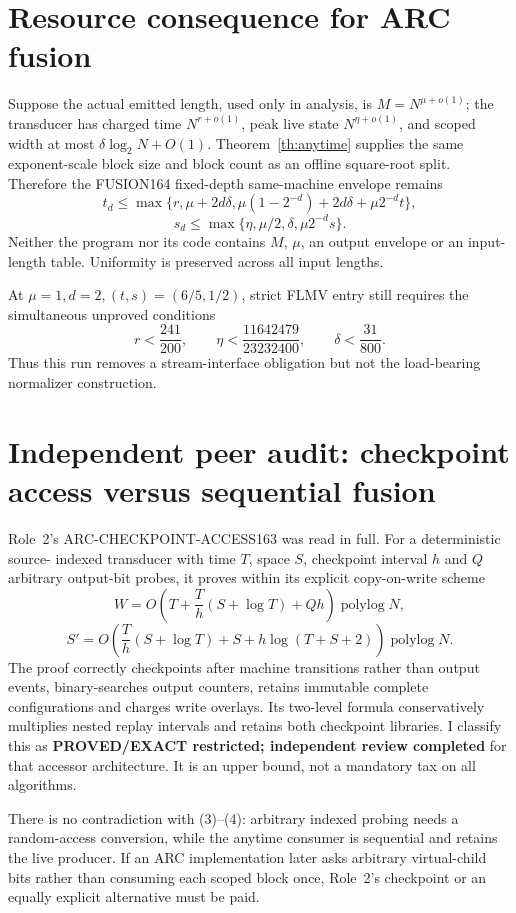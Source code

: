 \documentclass[11pt]{article}
\begin{document}
\section{Resource consequence for ARC fusion}
Suppose the actual emitted length, used only in analysis, is
$M=N^{\mu+o(1)}$; the transducer has charged time $N^{r+o(1)}$, peak live state
$N^{\eta+o(1)}$, and scoped width at most
$\delta\log_2N+O(1)$.  Theorem~\ref{th:anytime} supplies the same exponent-scale
block size and block count as an offline square-root split.  Therefore the
FUSION164 fixed-depth same-machine envelope remains
\[
t_d\le\max\{r,\mu+2d\delta,
\mu(1-2^{-d})+2d\delta+\mu2^{-d}t\},                       \tag{3}
\]
\[
s_d\le\max\{\eta,\mu/2,\delta,\mu2^{-d}s\}.               \tag{4}
\]
Neither the program nor its code contains $M$, $\mu$, an output envelope or an
input-length table.  Uniformity is preserved across all input lengths.

At $\mu=1,d=2,(t,s)=(6/5,1/2)$, strict FLMV entry still requires the simultaneous
unproved conditions
\[
r<\frac{241}{200},\qquad
\eta<\frac{11642479}{23232400},\qquad
\delta<\frac{31}{800}.                                    \tag{5}
\]
Thus this run removes a stream-interface obligation but not the load-bearing
normalizer construction.

\section{Independent peer audit: checkpoint access versus sequential fusion}
Role~2's ARC-CHECKPOINT-ACCESS163 was read in full.  For a deterministic source-
indexed transducer with time $T$, space $S$, checkpoint interval $h$ and $Q$
arbitrary output-bit probes, it proves within its explicit copy-on-write scheme
\[
W=O\!\left(T+\frac{T}{h}(S+\log T)+Qh\right)\operatorname{polylog}N,
\]
\[
S'=O\!\left(\frac{T}{h}(S+\log T)+S+h\log(T+S+2)\right)
\operatorname{polylog}N.
\]
The proof correctly checkpoints after machine transitions rather than output
events, binary-searches output counters, retains immutable complete
configurations and charges write overlays.  Its two-level formula conservatively
multiplies nested replay intervals and retains both checkpoint libraries.  I
classify this as \textbf{PROVED/EXACT restricted; independent review completed}
for that accessor architecture.  It is an upper bound, not a mandatory tax on
all algorithms.

There is no contradiction with (3)--(4): arbitrary indexed probing needs a
random-access conversion, while the anytime consumer is sequential and retains
the live producer.  If an ARC implementation later asks arbitrary virtual-child
bits rather than consuming each scoped block once, Role~2's checkpoint or an
equally explicit alternative must be paid.
\end{document}
